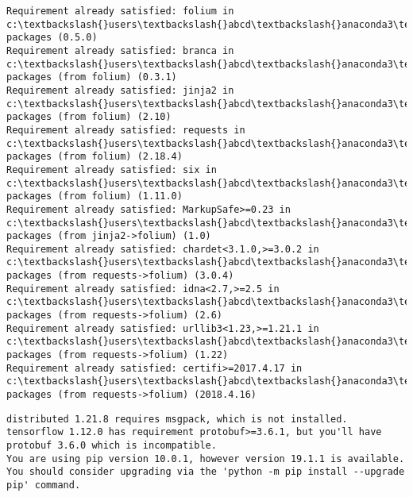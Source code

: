 \documentclass[11pt]{article}
\begin{document}
    \begin{Verbatim}[commandchars=\\\{\}]
Requirement already satisfied: folium in c:\textbackslash{}users\textbackslash{}abcd\textbackslash{}anaconda3\textbackslash{}lib\textbackslash{}site-packages (0.5.0)
Requirement already satisfied: branca in c:\textbackslash{}users\textbackslash{}abcd\textbackslash{}anaconda3\textbackslash{}lib\textbackslash{}site-packages (from folium) (0.3.1)
Requirement already satisfied: jinja2 in c:\textbackslash{}users\textbackslash{}abcd\textbackslash{}anaconda3\textbackslash{}lib\textbackslash{}site-packages (from folium) (2.10)
Requirement already satisfied: requests in c:\textbackslash{}users\textbackslash{}abcd\textbackslash{}anaconda3\textbackslash{}lib\textbackslash{}site-packages (from folium) (2.18.4)
Requirement already satisfied: six in c:\textbackslash{}users\textbackslash{}abcd\textbackslash{}anaconda3\textbackslash{}lib\textbackslash{}site-packages (from folium) (1.11.0)
Requirement already satisfied: MarkupSafe>=0.23 in c:\textbackslash{}users\textbackslash{}abcd\textbackslash{}anaconda3\textbackslash{}lib\textbackslash{}site-packages (from jinja2->folium) (1.0)
Requirement already satisfied: chardet<3.1.0,>=3.0.2 in c:\textbackslash{}users\textbackslash{}abcd\textbackslash{}anaconda3\textbackslash{}lib\textbackslash{}site-packages (from requests->folium) (3.0.4)
Requirement already satisfied: idna<2.7,>=2.5 in c:\textbackslash{}users\textbackslash{}abcd\textbackslash{}anaconda3\textbackslash{}lib\textbackslash{}site-packages (from requests->folium) (2.6)
Requirement already satisfied: urllib3<1.23,>=1.21.1 in c:\textbackslash{}users\textbackslash{}abcd\textbackslash{}anaconda3\textbackslash{}lib\textbackslash{}site-packages (from requests->folium) (1.22)
Requirement already satisfied: certifi>=2017.4.17 in c:\textbackslash{}users\textbackslash{}abcd\textbackslash{}anaconda3\textbackslash{}lib\textbackslash{}site-packages (from requests->folium) (2018.4.16)

    \end{Verbatim}

    \begin{Verbatim}[commandchars=\\\{\}]
distributed 1.21.8 requires msgpack, which is not installed.
tensorflow 1.12.0 has requirement protobuf>=3.6.1, but you'll have protobuf 3.6.0 which is incompatible.
You are using pip version 10.0.1, however version 19.1.1 is available.
You should consider upgrading via the 'python -m pip install --upgrade pip' command.

    \end{Verbatim}
\end{document}
